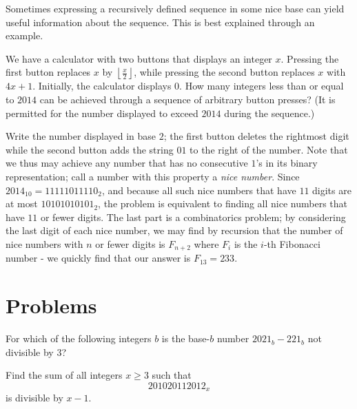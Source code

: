 \documentclass[mast]{lucky}
\begin{document}
Sometimes expressing a recursively defined sequence in some nice base can yield useful information about the sequence. This is best explained through an example. 

\begin{exam}
We have a calculator with two buttons that displays an integer $x$. Pressing the first button replaces $x$ by $\left\lfloor \frac x2\right\rfloor$, while pressing the second button replaces $x$ with $4x+1$. Initially, the calculator displays $0$. How many integers less than or equal to $2014$ can be achieved through a sequence of arbitrary button presses? (It is permitted for the number displayed to exceed $2014$ during the sequence.)
\end{exam}

\begin{sol}
Write the number displayed in base $2$; the first button deletes the rightmost digit while the second button adds the string $01$ to the right of the number. Note that we thus may achieve any number that has no consecutive $1$'s in its binary representation; call a number with this property a \textit{nice number}. Since $2014_{10}=11111011110_2$, and because all such nice numbers that have $11$ digits are at most $10101010101_2$, the problem is equivalent to finding all nice numbers that have $11$ or fewer digits. The last part is a combinatorics problem; by considering the last digit of each nice number, we may find by recursion that the number of nice numbers with $n$ or fewer digits is $F_{n+2}$ where $F_i$ is the $i$-th Fibonacci number - we quickly find that our answer is $F_{13}=233$. 
\end{sol}

\pagebreak

\section{Problems}



\begin{req}[AMC 10A 2021/11]{1}
For which of the following integers $b$ is the base-$b$ number $2021_b - 221_b$ not divisible by $3$?

\end{req}

\begin{prob}[SMT 2012]{2}
Find the sum of all integers $x\ge 3$ such that \[201020112012_x\] is divisible by $x-1$.
\end{prob}
\end{document}
